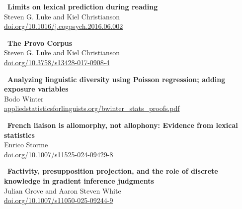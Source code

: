 \documentclass[11pt,letterpaper]{article}
\begin{document}
\begin{tcolorbox}[colback=white,colframe=accentblue,boxrule=0.5pt,arc=2mm]
\faBook\ \textbf{Limits on lexical prediction during reading}\\
\phantom{\faBook\ }Steven G. Luke and Kiel Christianson\\
\phantom{\faBook\ }\href{https://doi.org/10.1016/j.cogpsych.2016.06.002}{doi.org/10.1016/j.cogpsych.2016.06.002}
\end{tcolorbox}

\begin{tcolorbox}[colback=white,colframe=accentblue,boxrule=0.5pt,arc=2mm]
\faBook\ \textbf{The Provo Corpus}\\
\phantom{\faBook\ }Steven G. Luke and Kiel Christianson\\
\phantom{\faBook\ }\href{https://doi.org/10.3758/s13428-017-0908-4}{doi.org/10.3758/s13428-017-0908-4}
\end{tcolorbox}

\begin{tcolorbox}[colback=white,colframe=accentblue,boxrule=0.5pt,arc=2mm]
\faBook\ \textbf{Analyzing linguistic diversity using Poisson regression; adding exposure variables}\\
\phantom{\faBook\ }Bodo Winter\\
\phantom{\faBook\ }\href{https://appliedstatisticsforlinguists.org/bwinter_stats_proofs.pdf}{appliedstatisticsforlinguists.org/bwinter\_stats\_proofs.pdf}
\end{tcolorbox}

\begin{tcolorbox}[colback=white,colframe=accentblue,boxrule=0.5pt,arc=2mm]
\faBook\ \textbf{French liaison is allomorphy, not allophony: Evidence from lexical statistics}\\
\phantom{\faBook\ }Enrico Storme\\
\phantom{\faBook\ }\href{https://doi.org/10.1007/s11525-024-09429-8}{doi.org/10.1007/s11525-024-09429-8}
\end{tcolorbox}

\begin{tcolorbox}[colback=white,colframe=accentblue,boxrule=0.5pt,arc=2mm]
\faBook\ \textbf{Factivity, presupposition projection, and the role of discrete knowledge in gradient inference judgments}\\
\phantom{\faBook\ }Julian Grove and Aaron Steven White\\
\phantom{\faBook\ }\href{https://doi.org/10.1007/s11050-025-09244-9}{doi.org/10.1007/s11050-025-09244-9}
\end{tcolorbox}
\end{document}
